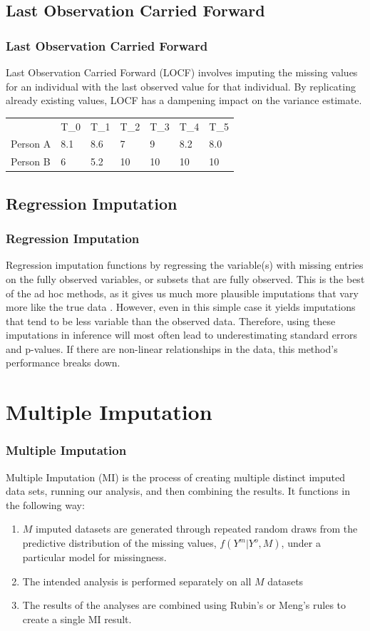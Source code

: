 \documentclass{beamer}
\begin{document}
\subsection{Last Observation Carried Forward}
\begin{frame}
\frametitle{Last Observation Carried Forward}
Last Observation Carried Forward (LOCF) involves imputing the missing values for an individual with the last observed value for that individual. By replicating already existing values, LOCF has a dampening impact on the variance estimate.

\begin{table}[]
	\begin{tabular}{lllllll}
		& T\_0 & T\_1 & T\_2 & T\_3 & T\_4 & T\_5 \\
		Person A & 8.1  & 8.6  & 7    & 9    & 8.2  & 8.0  \\
		Person B & 6    & 5.2  & 10   & 10   & 10   & 10  
	\end{tabular}
\end{table}

\end{frame}

\subsection{Regression Imputation}
\begin{frame}
\frametitle{Regression Imputation}
Regression imputation functions by regressing the variable(s) with missing entries on the fully observed variables, or subsets that are fully observed. This is the best of the ad hoc methods, as it gives us much more plausible imputations that vary more like the true data \cite[P. 37]{Molenberghs2015}. However, even in this simple case it yields imputations that tend to be less variable than the observed data. Therefore, using these imputations in inference will most often lead to underestimating standard errors and p-values. If there are non-linear relationships in the data, this method's performance breaks down.
\end{frame}


\section{Multiple Imputation}
\begin{frame}
\frametitle{Multiple Imputation}
Multiple Imputation (MI) is the process of creating multiple distinct imputed data sets, running our analysis, and then combining the results. It functions in the following way:
\begin{enumerate}
	\item<1-> $M$ imputed datasets are generated through repeated random draws from the predictive distribution of the missing values, $f(Y^{m}|Y^{o}, M)$, under a particular model for missingness.
	\item<2-> The intended analysis is performed separately on all $M$ datasets
	\item<3-> The results of the analyses are combined using Rubin's or Meng's rules to create a single MI result.
\end{enumerate}
\end{frame}
\end{document}
